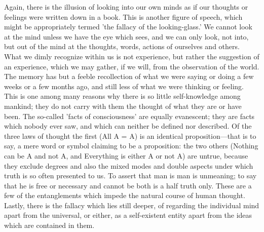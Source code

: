 \documentclass[11pt,letter]{article}
\begin{document}
\par  Again, there is the illusion of looking into our own minds as if our thoughts or feelings were written down in a book. This is another figure of speech, which might be appropriately termed 'the fallacy of the looking-glass.' We cannot look at the mind unless we have the eye which sees, and we can only look, not into, but out of the mind at the thoughts, words, actions of ourselves and others. What we dimly recognize within us is not experience, but rather the suggestion of an experience, which we may gather, if we will, from the observation of the world. The memory has but a feeble recollection of what we were saying or doing a few weeks or a few months ago, and still less of what we were thinking or feeling. This is one among many reasons why there is so little self-knowledge among mankind; they do not carry with them the thought of what they are or have been. The so-called 'facts of consciousness' are equally evanescent; they are facts which nobody ever saw, and which can neither be defined nor described. Of the three laws of thought the first (All A = A) is an identical proposition—that is to say, a mere word or symbol claiming to be a proposition: the two others (Nothing can be A and not A, and Everything is either A or not A) are untrue, because they exclude degrees and also the mixed modes and double aspects under which truth is so often presented to us. To assert that man is man is unmeaning; to say that he is free or necessary and cannot be both is a half truth only. These are a few of the entanglements which impede the natural course of human thought. Lastly, there is the fallacy which lies still deeper, of regarding the individual mind apart from the universal, or either, as a self-existent entity apart from the ideas which are contained in them.
\end{document}
